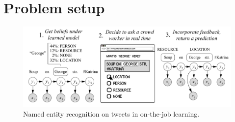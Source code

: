 \section{Problem setup}
\label{sec:model}

\begin{figure}[t]
  \begin{centering}
  \includegraphics[width=1.0\textwidth]{figures/intro-banner.pdf}
  \end{centering}
  \caption{
    Named entity recognition on tweets in on-the-job learning.
}
\label{fig:crf}
\end{figure}



